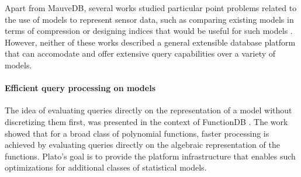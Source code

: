 Apart from MauveDB, several works studied particular point problems related to the use of models to represent sensor data, such as comparing existing models in terms of compression or designing indices that would be useful for such models \cite{aberer-cloud, aberer-compression}. However, neither of these works described a general extensible database platform that can accomodate and offer extensive query capabilities over a variety of models.

\paragraph{Efficient query processing on models} The idea of evaluating queries directly on the representation of a model without discretizing them first, was presented in the context of FunctionDB \cite{functiondb}. The work showed that for a broad class of polynomial functions, faster processing is achieved by evaluating queries directly on the algebraic representation of the functions. Plato's goal is to provide the platform infrastructure that enables such optimizations for additional classes of statistical models.

